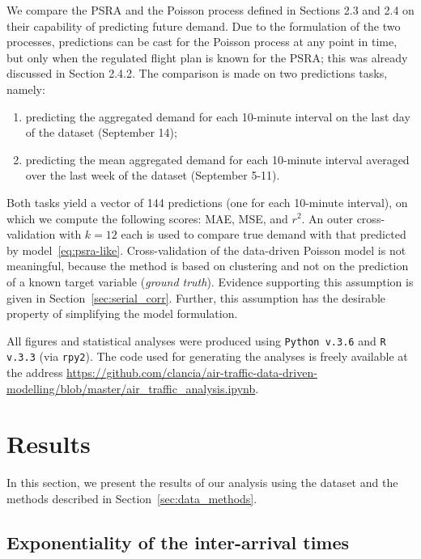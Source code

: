 \documentclass[final,review]{elsarticle}
\begin{document}
We compare the \ac{PSRA} and the Poisson process defined in Sections 2.3 and 2.4 on their capability of predicting future demand. Due to the formulation of the two processes, predictions can be cast for the Poisson process at any point in time, but only when the regulated flight plan is known for the \ac{PSRA}; this was already discussed in Section 2.4.2.
The comparison is made on two predictions tasks, namely:
\begin{enumerate}
  \item predicting the aggregated demand for each 10-minute interval on the last day of the dataset (September 14);
  \item predicting the mean aggregated demand for each 10-minute interval averaged over the last week of the dataset (September 5-11).
\end{enumerate}
Both tasks yield a vector of 144 predictions (one for each 10-minute interval), on which we compute the following scores: \ac{MAE}, \ac{MSE}, and \(r^2\).
An outer cross-validation with $k = 12$ each is used to compare true demand with that predicted by model~\eqref{eq:psra-like}.
Cross-validation of the data-driven Poisson model is not meaningful, because the method is based on clustering and not on the prediction of a known target variable (\emph{ground truth}).
Evidence supporting this assumption is given in Section~\ref{sec:serial_corr}.
Further, this assumption has the desirable property of simplifying the model formulation.

All figures and statistical analyses were produced using \texttt{Python v.3.6} and \texttt{R v.3.3} (via \texttt{rpy2}). The code used for generating the analyses is freely available at the address \url{https://github.com/clancia/air-traffic-data-driven-modelling/blob/master/air_traffic_analysis.ipynb}.

\section{Results}\label{sec:results}

In this section, we present the results of our analysis using the dataset and the methods described in Section~\ref{sec:data_methods}.

\subsection{Exponentiality of the inter-arrival times}\label{sec:exp}
\end{document}
